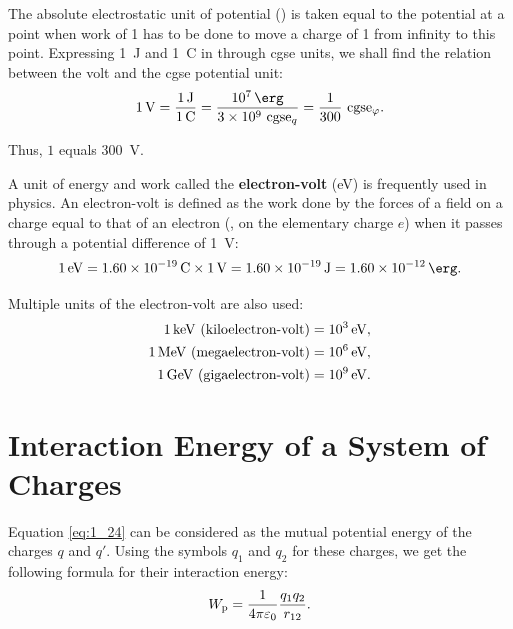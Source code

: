 The absolute electrostatic unit of potential (\cgse{\varphi}) is taken equal to the potential at a point when work of \SI{1}{\erg} has to be done to move a charge of \num{+1} from infinity to this point. Expressing \SI{1}{\joule} and \SI{1}{\coulomb} in  through cgse units, we shall find the relation between the volt and the cgse potential unit:
\begin{equation}\label{eq:1_33}
	\SI{1}{\volt} = \frac{\SI{1}{\joule}}{\SI{1}{\coulomb}} = \frac{\SI{e7}{\erg}}{\num{3e9}\cgse{q}} = \frac{1}{300}\cgse{\varphi}.
\end{equation}

\noindent
Thus, $1$\cgse{\varphi} equals \SI{300}{\volt}.

A unit of energy and work called the \textbf{electron-volt} (\si{\electronvolt}) is frequently used in physics. An electron-volt is defined as the work done by the forces of a field on a charge equal to that of an electron (\ie, on the elementary charge $e$) when it passes through a potential difference of \SI{1}{\volt}:
\begin{equation}\label{eq:1_34}
	\SI{1}{\electronvolt} = \SI{1.60e-19}{\coulomb} \times \SI{1}{\volt} = \SI{1.60e-19}{\joule} = \SI{1.60e-12}{\erg}.
\end{equation}

\noindent
Multiple units of the electron-volt are also used:
\begin{align*}
	\text{\SI{1}{\kilo\electronvolt} (kiloelectron-volt)} &= \SI{e3}{\electronvolt},\\
	\text{\SI{1}{\mega\electronvolt} (megaelectron-volt)} &= \SI{e6}{\electronvolt},\\
	\text{\SI{1}{\giga\electronvolt} (gigaelectron-volt)} &= \SI{e9}{\electronvolt}.
\end{align*}

\section{Interaction Energy of a System of Charges}\label{sec:1_7}

Equation \eqref{eq:1_24} can be considered as the mutual potential energy of the charges $q$ and $q'$. Using the symbols $q_1$ and $q_2$ for these charges, we get the following formula for their interaction energy:
\begin{equation}\label{eq:1_35}
	W_{\text{p}} = \frac{1}{4\pi\varepsilon_0} \frac{q_1q_2}{r_{12}}.
\end{equation}

